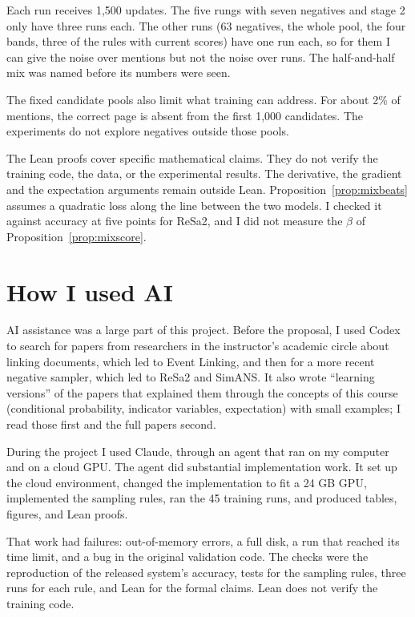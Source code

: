 \documentclass[11pt]{article}
\theoremstyle{definition}
\begin{document}
Each run receives 1,500 updates. The five rungs with seven negatives and stage 2 only have three runs each. The other runs (63 negatives, the whole pool, the four bands, three of the rules with current scores) have one run each, so for them I can give the noise over mentions but not the noise over runs. The half-and-half mix was named before its numbers were seen.

The fixed candidate pools also limit what training can address. For about 2\% of mentions, the correct page is absent from the first 1,000 candidates. The experiments do not explore negatives outside those pools.

The Lean proofs cover specific mathematical claims. They do not verify the training code, the data, or the experimental results. The derivative, the gradient and the expectation arguments remain outside Lean. Proposition~\ref{prop:mixbeats} assumes a quadratic loss along the line between the two models. I checked it against accuracy at five points for ReSa2, and I did not measure the $\beta$ of Proposition~\ref{prop:mixscore}.

\section*{How I used AI}

AI assistance was a large part of this project. Before the proposal, I used Codex to search for papers from researchers in the instructor's academic circle about linking documents, which led to Event Linking, and then for a more recent negative sampler, which led to ReSa2 and SimANS. It also wrote ``learning versions'' of the papers that explained them through the concepts of this course (conditional probability, indicator variables, expectation) with small examples; I read those first and the full papers second.

During the project I used Claude, through an agent that ran on my computer and on a cloud GPU. The agent did substantial implementation work. It set up the cloud environment, changed the implementation to fit a 24 GB GPU, implemented the sampling rules, ran the 45 training runs, and produced tables, figures, and Lean proofs.

That work had failures: out-of-memory errors, a full disk, a run that reached its time limit, and a bug in the original validation code. The checks were the reproduction of the released system's accuracy, tests for the sampling rules, three runs for each rule, and Lean for the formal claims. Lean does not verify the training code.
\end{document}
